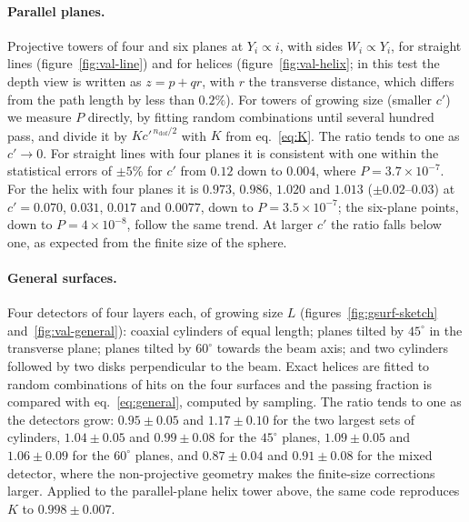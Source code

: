 \IfFileExists{jinst.cls}{\documentclass[a4paper,11pt]{jinst}}
\newcommand{\ndof}{n_\mathrm{dof}}
\begin{document}
\paragraph{Parallel planes.} Projective towers of four and six planes at $Y_i\propto i$, with
sides $W_i\propto Y_i$, for straight lines (figure~\ref{fig:val-line}) and for helices
(figure~\ref{fig:val-helix}; in this test the depth view is written as $z=p+qr$, with $r$ the
transverse distance, which differs from the path length by less than $0.2\%$). For towers of
growing size (smaller $c'$) we measure $P$ directly, by fitting random combinations until
several hundred pass, and divide it by $Kc'^{\,\ndof/2}$ with $K$ from eq.~\eqref{eq:K}. The
ratio tends to one as $c'\to0$. For straight lines with four planes it is consistent with one
within the statistical errors of $\pm5\%$ for $c'$ from $0.12$ down to $0.004$, where
$P=3.7\times10^{-7}$. For the helix with four planes it is $0.973$, $0.986$, $1.020$ and $1.013$
($\pm0.02$--$0.03$) at $c'=0.070$, $0.031$, $0.017$ and $0.0077$, down to $P=3.5\times10^{-7}$; the
six-plane points, down to $P=4\times10^{-8}$, follow the same trend. At larger $c'$ the ratio
falls below one, as expected from the finite size of the sphere.

\paragraph{General surfaces.} Four detectors of four layers each, of growing size $L$
(figures~\ref{fig:gsurf-sketch} and~\ref{fig:val-general}): coaxial cylinders of equal length; planes tilted
by $45^\circ$ in the transverse plane; planes tilted by $60^\circ$ towards the beam axis; and two
cylinders followed by two disks perpendicular to the beam. Exact helices are fitted to random combinations of hits on the four surfaces and the
passing fraction is compared with eq.~\eqref{eq:general}, computed by sampling. The ratio tends to
one as the detectors grow: $0.95\pm0.05$ and $1.17\pm0.10$ for the two largest sets of cylinders,
$1.04\pm0.05$ and $0.99\pm0.08$ for the $45^\circ$ planes, $1.09\pm0.05$ and $1.06\pm0.09$ for the
$60^\circ$ planes, and $0.87\pm0.04$ and $0.91\pm0.08$ for the mixed detector, where the
non-projective geometry makes the finite-size corrections larger. Applied to the parallel-plane
helix tower above, the same code reproduces $K$ to $0.998\pm0.007$.
\end{document}
